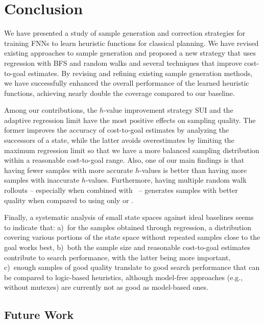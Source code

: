 \chapter{Conclusion}
\label{sec:conclusion}

We have presented a study of sample generation and correction strategies for training FNNs to learn heuristic functions for classical planning. We have revised existing approaches to sample generation and proposed a new strategy that uses regression with BFS and random walks and several techniques that improve cost-to-goal estimates. By revising and refining existing sample generation methods, we have successfully enhanced the overall performance of the learned heuristic functions, achieving nearly double the coverage compared to our baseline.


Among our contributions, the $h$-value improvement strategy SUI and the adaptive regression limit \meanfx have the most positive effects on sampling quality. The former improves the accuracy of cost-to-goal estimates by analyzing the successors of a state, while the latter avoids overestimates by limiting the maximum regression limit so that we have a more balanced sampling distribution within a reasonable cost-to-goal range. Also, one of our main findings is that having fewer samples with more accurate $h$-values is better than having more samples with inaccurate $h$-values. Furthermore, having multiple random walk rollouts -- especially when combined with \bfs~-- generates samples with better quality when compared to using only \bfs or \dfs.

Finally, a systematic analysis of small state spaces against ideal baselines seems to indicate that: a)~for the samples obtained through regression, a distribution covering various portions of the state space without repeated samples close to the goal works best, b)~both the sample size and reasonable cost-to-goal estimates contribute to search performance, with the latter being more important, c)~enough samples of good quality translate to good search performance that can be compared to logic-based heuristics, although model-free approaches (e.g., without mutexes) are currently not as good as model-based ones.

\section{Future Work}

